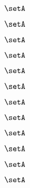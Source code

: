 {\begin{forslides}
        \begin{equation}
            \label{eq:slides-translation-61}
            \setA
        \end{equation}

        \begin{equation}
            \label{eq:slides-translation-62}
            \setA
        \end{equation}

        \begin{equation}
            \label{eq:slides-translation-63}
            \setA
        \end{equation}

        \begin{equation}
            \label{eq:slides-translation-64}
            \setA
        \end{equation}

        \begin{equation}
            \label{eq:slides-translation-65}
            \setA
        \end{equation}

        \begin{equation}
            \label{eq:slides-translation-66}
            \setA
        \end{equation}

        \begin{equation}
            \label{eq:slides-translation-67}
            \setA
        \end{equation}

        \begin{equation}
            \label{eq:slides-translation-68}
            \setA
        \end{equation}

        \begin{equation}
            \label{eq:slides-translation-69}
            \setA
        \end{equation}

        \begin{equation}
            \label{eq:slides-translation-70}
            \setA
        \end{equation}

        \begin{equation}
            \label{eq:slides-translation-71}
            \setA
        \end{equation}

        \begin{equation}
            \label{eq:slides-translation-72}
            \setA
        \end{equation}


\end{forslides}}
